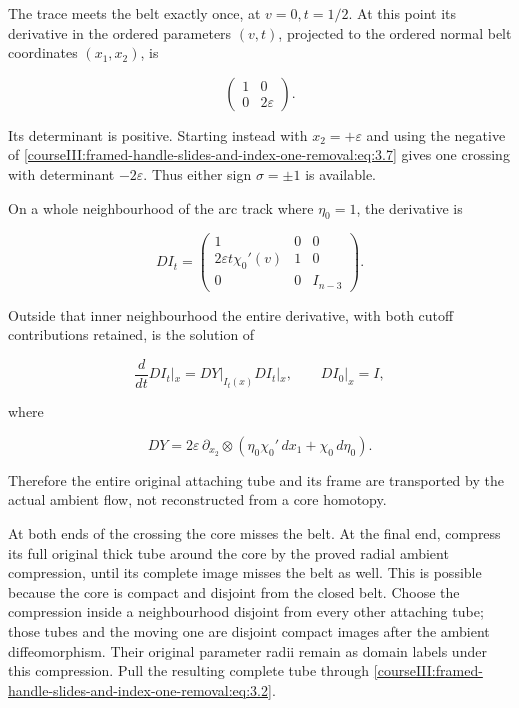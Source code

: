 The trace meets the belt exactly once, at \(v=0,t=1/2\). At this point its derivative in the ordered parameters \((v,t)\), projected to the ordered normal belt coordinates \((x_1,x_2)\), is

\begin{equation}
\begin{pmatrix}1&0\\0&2\varepsilon\end{pmatrix}.
 \label{courseIII:framed-handle-slides-and-index-one-removal:eq:3.9}
\end{equation}

Its determinant is positive. Starting instead with \(x_2=+\varepsilon\) and using the negative of \eqref{courseIII:framed-handle-slides-and-index-one-removal:eq:3.7} gives one crossing with determinant \(-2\varepsilon\). Thus either sign \(\sigma=\pm1\) is available.

On a whole neighbourhood of the arc track where \(\eta_0=1\), the derivative is

\begin{equation}
D I_t=
 \begin{pmatrix}
 1&0&0\\
 2\varepsilon t\chi_0'(v)&1&0\\
 0&0&I_{n-3}
 \end{pmatrix}.
 \label{courseIII:framed-handle-slides-and-index-one-removal:eq:3.10}
\end{equation}

Outside that inner neighbourhood the entire derivative, with both cutoff contributions retained, is the solution of

\begin{equation}
\frac{d}{dt}D I_t|_x
   =D Y|_{I_t(x)}D I_t|_x,\qquad
 D I_0|_x=I,
 \label{courseIII:framed-handle-slides-and-index-one-removal:eq:3.11}
\end{equation}

where

\begin{equation}
D Y=2\varepsilon\,\partial_{x_2}
       \otimes\left(\eta_0\chi_0'\,dx_1+\chi_0\,d\eta_0\right).
 \label{courseIII:framed-handle-slides-and-index-one-removal:eq:3.12}
\end{equation}

Therefore the entire original attaching tube and its frame are transported by the actual ambient flow, not reconstructed from a core homotopy.

At both ends of the crossing the core misses the belt. At the final end, compress its full original thick tube around the core by the proved radial ambient compression, until its complete image misses the belt as well. This is possible because the core is compact and disjoint from the closed belt. Choose the compression inside a neighbourhood disjoint from every other attaching tube; those tubes and the moving one are disjoint compact images after the ambient diffeomorphism. Their original parameter radii remain as domain labels under this compression. Pull the resulting complete tube through \eqref{courseIII:framed-handle-slides-and-index-one-removal:eq:3.2}.

